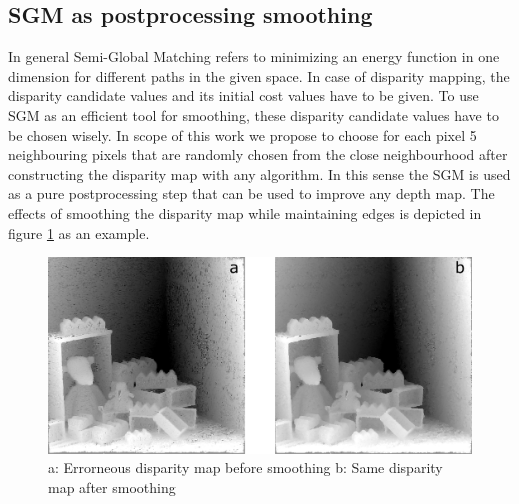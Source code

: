 \documentclass  [
  paper    = a4,
  BCOR     = 10mm,
  twoside,
  fontsize = 12pt,
  fleqn,
  toc      = bibnumbered,
  toc      = listofnumbered,
  numbers  = noendperiod,
  headings = normal,
  listof   = leveldown,
  version  = 3.03
]                                       {scrreprt}
\begin{document}
\subsection{SGM as postprocessing smoothing}
\label{sec:postprocessing_smoothing}
In general Semi-Global Matching refers to minimizing an energy function in one dimension for different paths in the given space. In case of disparity mapping, the disparity candidate values and its initial cost values have to be given. To use SGM as an efficient tool for smoothing, these disparity candidate values have to be chosen wisely. In scope of this work we propose to choose for each pixel 5 neighbouring pixels that are randomly chosen from the close neighbourhood after constructing the disparity map with any algorithm. In this sense the SGM is used as a pure postprocessing step that can be used to improve any depth map. The effects of smoothing the disparity map while maintaining edges is depicted in figure \ref{fig:sgmpprexample} as an example.
\begin{figure}
	\centering
	\includegraphics[width=1\linewidth]{images/sgm_ppr_example}
	\caption[Examplefor postprocessing smoothing]{a: Errorneous disparity map before smoothing b: Same disparity map after smoothing}
	\label{fig:sgmpprexample}
\end{figure}
\end{document}
